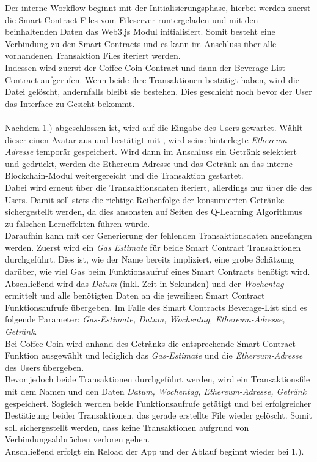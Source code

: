 Der interne Workflow beginnt mit der Initialisierungsphase, hierbei werden zuerst die Smart Contract Files vom Fileserver runtergeladen und mit den beinhaltenden Daten das Web3.js Modul initialisiert. Somit besteht eine Verbindung zu den Smart Contracts und es kann im Anschluss über alle vorhandenen Transaktion Files iteriert werden. \\
Indessen wird zuerst der Coffee-Coin Contract und dann der Beverage-List Contract aufgerufen. Wenn beide ihre Transaktionen bestätigt haben, wird die Datei gelöscht, andernfalls bleibt sie bestehen. Dies geschieht noch bevor der User das Interface zu Gesicht bekommt.\\\\
Nachdem 1.) abgeschlossen ist, wird auf die Eingabe des Users gewartet. Wählt dieser einen Avatar aus und bestätigt mit , wird seine hinterlegte \textit{Ethereum-Adresse} temporär gespeichert. Wird dann im Anschluss ein Getränk selektiert und  gedrückt, werden die Ethereum-Adresse und das Getränk an das interne Blockchain-Modul weitergereicht und die Transaktion gestartet. \\
Dabei wird erneut über die Transaktionsdaten iteriert, allerdings nur über die des Users. Damit soll stets die richtige Reihenfolge der konsumierten Getränke sichergestellt werden, da dies ansonsten auf Seiten des Q-Learning Algorithmus zu falschen Lerneffekten führen würde.\\
Daraufhin kann mit der Generierung der fehlenden Transaktionsdaten angefangen werden. Zuerst wird ein \textit{Gas Estimate} für beide Smart Contract Transaktionen durchgeführt. Dies ist, wie der Name bereits impliziert, eine grobe Schätzung darüber, wie viel Gas beim Funktionsaufruf eines Smart Contracts benötigt wird. \\
Abschließend wird das \textit{Datum} (inkl. Zeit in Sekunden) und der \textit{Wochentag} ermittelt und alle benötigten Daten an die jeweiligen Smart Contract Funktionsaufrufe übergeben. Im Falle des Smart Contracts Beverage-List sind es folgende Parameter: \textit{Gas-Estimate, Datum, Wochentag, Ethereum-Adresse, Getränk}.\\
\noindent Bei Coffee-Coin wird anhand des Getränks die entsprechende Smart Contract Funktion ausgewählt und lediglich das \textit{Gas-Estimate} und die \textit{Ethereum-Adresse} des Users übergeben.\\
Bevor jedoch beide Transaktionen durchgeführt werden, wird ein Transaktionsfile mit dem Namen  und den Daten \textit{Datum, Wochentag, Ethereum-Adresse, Getränk} gespeichert. Sogleich werden beide Funktionsaufrufe getätigt und bei erfolgreicher Bestätigung beider Transaktionen, das gerade erstellte File wieder gelöscht. Somit soll sichergestellt werden, dass keine Transaktionen aufgrund von Verbindungsabbrüchen verloren gehen. \\
Anschließend erfolgt ein Reload der App und der Ablauf beginnt wieder bei 1.).